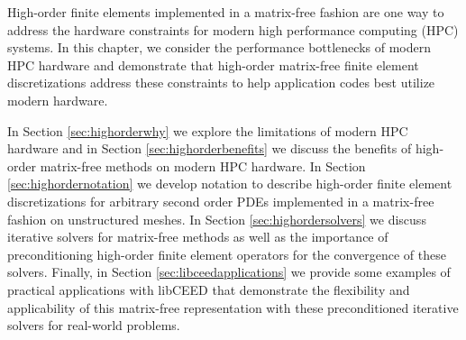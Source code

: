 High-order finite elements implemented in a matrix-free fashion are one way to address the hardware constraints for modern high performance computing (HPC) systems.
In this chapter, we consider the performance bottlenecks of modern HPC hardware and demonstrate that high-order matrix-free finite element discretizations address these constraints to help application codes best utilize modern hardware.

In Section \ref{sec:highorderwhy} we explore the limitations of modern HPC hardware and in Section \ref{sec:highorderbenefits} we discuss the benefits of high-order matrix-free methods on modern HPC hardware.
In Section \ref{sec:highordernotation} we develop notation to describe high-order finite element discretizations for arbitrary second order PDEs implemented in a matrix-free fashion on unstructured meshes.
In Section \ref{sec:highordersolvers} we discuss iterative solvers for matrix-free methods as well as the importance of preconditioning high-order finite element operators for the convergence of these solvers.
Finally, in Section \ref{sec:libceedapplications} we provide some examples of practical applications with libCEED that demonstrate the flexibility and applicability of this matrix-free representation with these preconditioned iterative solvers for real-world problems.